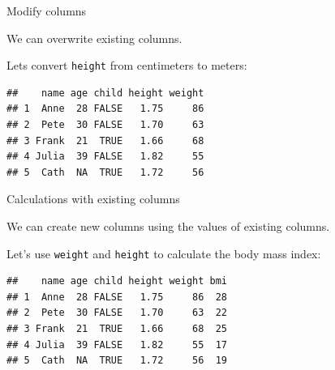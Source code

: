 \documentclass[ignorenonframetext,]{beamer}
\newenvironment{Shaded}{\begin{snugshade}}{\end{snugshade}}
\newcommand{\DecValTok}[1]{\textcolor[rgb]{0.00,0.00,0.81}{#1}}
\newcommand{\KeywordTok}[1]{\textcolor[rgb]{0.13,0.29,0.53}{\textbf{#1}}}
\newcommand{\NormalTok}[1]{#1}
\newcommand{\OperatorTok}[1]{\textcolor[rgb]{0.81,0.36,0.00}{\textbf{#1}}}
\newcommand{\StringTok}[1]{\textcolor[rgb]{0.31,0.60,0.02}{#1}}
\begin{document}
\begin{frame}[fragile]{Modify columns}
\protect\hypertarget{modify-columns}{}

We can overwrite existing columns.

Lets convert \texttt{height} from centimeters to meters:

\begin{Shaded}
\end{Shaded}

\begin{verbatim}
##    name age child height weight
## 1  Anne  28 FALSE   1.75     86
## 2  Pete  30 FALSE   1.70     63
## 3 Frank  21  TRUE   1.66     68
## 4 Julia  39 FALSE   1.82     55
## 5  Cath  NA  TRUE   1.72     56
\end{verbatim}

\end{frame}

\begin{frame}[fragile]{Calculations with existing columns}
\protect\hypertarget{calculations-with-existing-columns}{}

We can create new columns using the values of existing columns.

Let's use \texttt{weight} and \texttt{height} to calculate the body mass
index:

\begin{Shaded}
\end{Shaded}

\begin{verbatim}
##    name age child height weight bmi
## 1  Anne  28 FALSE   1.75     86  28
## 2  Pete  30 FALSE   1.70     63  22
## 3 Frank  21  TRUE   1.66     68  25
## 4 Julia  39 FALSE   1.82     55  17
## 5  Cath  NA  TRUE   1.72     56  19
\end{verbatim}

\end{frame}
\end{document}
